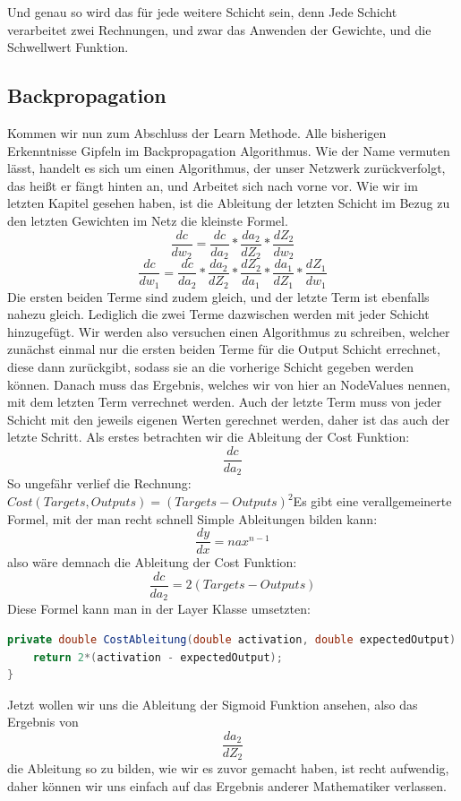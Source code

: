 \documentclass[12pt]{article}
\begin{document}
Und genau so wird das für jede weitere Schicht sein, denn Jede Schicht verarbeitet zwei Rechnungen, und zwar das Anwenden der Gewichte, und die Schwellwert Funktion.\subsection{Backpropagation}Kommen wir nun zum Abschluss der Learn Methode. Alle bisherigen Erkenntnisse Gipfeln im Backpropagation Algorithmus. Wie der Name vermuten lässt, handelt es sich um einen Algorithmus, der unser Netzwerk zurückverfolgt, das heißt er fängt hinten an, und Arbeitet sich nach vorne vor. 
Wie wir im letzten Kapitel gesehen haben, ist die Ableitung der letzten Schicht im Bezug zu den letzten Gewichten im Netz die kleinste Formel. 
$$\frac{ dc }{ dw_{ 2 } }=
\frac{ dc }{ da_{ 2 } }*
\frac{ da_{ 2 } }{ dZ_{ 2 } }*
\frac{ dZ_{ 2 } }{ dw_{ 2 } }$$
$$\frac{ dc }{ dw_{ 1 } }=
\frac{ dc }{ da_{ 2 } }*
\frac{ da_{ 2 } }{ dZ_{ 2 } }*
\frac{ dZ_{ 2 } }{ da_{ 1 } }*
\frac{ da_{ 1 } }{ dZ_{ 1 } }*
\frac{ dZ_{ 1 } }{ dw_{ 1 } }$$
Die ersten beiden Terme sind zudem gleich, und der letzte Term ist ebenfalls nahezu gleich. Lediglich die zwei Terme dazwischen werden mit jeder Schicht hinzugefügt. Wir werden also versuchen einen Algorithmus zu schreiben, welcher zunächst einmal nur die ersten beiden Terme für die Output Schicht errechnet, diese dann zurückgibt, sodass sie an die vorherige Schicht gegeben werden können. Danach muss das Ergebnis, welches wir von hier an NodeValues nennen, mit dem letzten Term verrechnet werden. Auch der letzte Term muss von jeder Schicht mit den jeweils eigenen Werten gerechnet werden, daher ist das auch der letzte Schritt. Als erstes betrachten wir die Ableitung der Cost Funktion:
$$\frac{ dc }{ da_{ 2 } }$$
So ungefähr verlief die Rechnung:
$Cost(Targets, Outputs) = (Targets - Outputs)^2$Es gibt eine verallgemeinerte Formel, mit der man recht schnell Simple Ableitungen bilden kann:
$$\frac{dy}{dx}=nax^{n-1}$$
also wäre demnach die Ableitung der Cost Funktion:
$$\frac{dc}{da_2}=2(Targets-Outputs)$$
Diese Formel kann man in der Layer Klasse umsetzten:\begin{lstlisting}[language=Java]
private double CostAbleitung(double activation, double expectedOutput) {
    return 2*(activation - expectedOutput);
}
\end{lstlisting}Jetzt wollen wir uns die Ableitung der Sigmoid Funktion ansehen, also das Ergebnis von
$$\frac{da_2}{dZ_2}$$
die Ableitung so zu bilden, wie wir es zuvor gemacht haben, ist recht aufwendig, daher können wir uns einfach auf das Ergebnis anderer Mathematiker verlassen.
\end{document}
